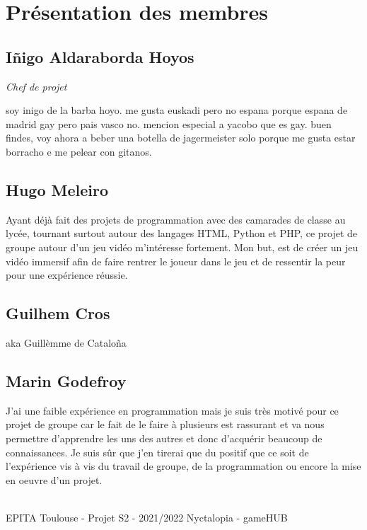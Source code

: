 \section{Présentation des membres}


\subsection{Iñigo Aldaraborda Hoyos}
\emph{Chef de projet}

soy inigo de la barba hoyo. me gusta euskadi pero no espana porque espana de madrid gay pero pais vasco no. mencion especial a yacobo que es gay. buen findes, voy ahora a beber una botella de jagermeister solo porque me gusta estar borracho e me pelear con gitanos.

\subsection{Hugo Meleiro}

Ayant déjà fait des projets de programmation avec des camarades de classe au lycée, tournant surtout autour des langages HTML, Python et PHP, ce projet de groupe autour d'un jeu vidéo m'intéresse fortement. 
Mon but, est de créer un jeu vidéo immersif afin de faire rentrer le joueur dans le jeu et de ressentir la peur pour une expérience réussie.

\subsection{Guilhem Cros}

aka Guillèmme de Cataloña

\subsection{Marin Godefroy}

J'ai une faible expérience en programmation mais je suis très motivé pour ce projet de groupe car le fait de le faire à plusieurs est rassurant et va nous permettre d'apprendre les uns des autres et donc d'acquérir beaucoup de connaissances. Je suis sûr que j'en tirerai que du positif que ce soit de l'expérience vis à vis du travail de groupe, de la programmation ou encore la mise en oeuvre d'un projet.

\vfill
\noindent\makebox[\linewidth]{\rule{.8\paperwidth}{.6pt}}\\[0.2cm]
EPITA Toulouse - Projet S2 - 2021/2022 \hfill Nyctalopia - gameHUB
\noindent\makebox[\linewidth]{\rule{.8\paperwidth}{.6pt}}

\newpage